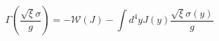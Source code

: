 \begin{equation}  \label{dudal2}
\Gamma\left(\frac{\sqrt{\xi}\sigma}{g}\right)=-\mathcal{W}(J)-\int d^{4}y
J(y)\frac{\sqrt{\xi}\sigma(y)}{g}
\end{equation}


